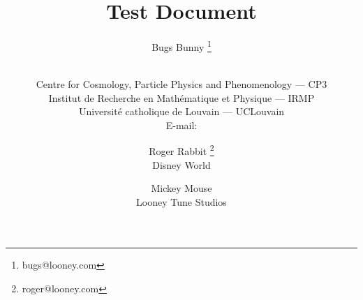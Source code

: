 \documentclass{PoS}
\title{Test Document}
\author{Bugs Bunny \thanks{bugs@looney.com}}
\author{
\speaker{Jan Hajer}\\
Centre for Cosmology, Particle Physics and Phenomenology --- CP3\\
Institut de Recherche en Mathématique et Physique --- IRMP\\
Université catholique de Louvain --- UCLouvain\\
E-mail: \email{jan.hajer@uclouvain.be}
}
\author{Roger Rabbit \thanks{roger@looney.com}\\Disney World}
\author{Mickey Mouse\\Looney Tune Studios}
\begin{document}
\blinddocument
\end{document}
